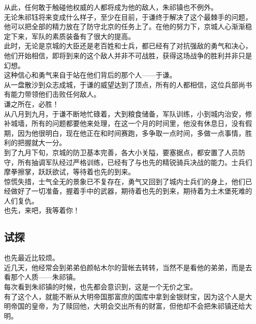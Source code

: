 \begin{multicols}{\theparacolNo}
从此，任何敢于触碰他权威的人都将成为他的敌人，朱祁镇也不例外。\\

无论朱祁钰将来变成什么样子，至少在目前，于谦终于解决了这个最棘手的问题，他可以把全部的精力放在了防守北京的任务上了。在他的努力下，京城人心渐渐稳定下来，军队的素质装备有了很大的提高。\\

此时，无论是京城的大臣还是老百姓和士兵，都已经有了对抗强敌的勇气和决心，他们开始相信，即将到来的这个敌人并非不可战胜，获得这场战争的胜利并非只是幻想。\\

这种信心和勇气来自于站在他们背后的那个人——于谦。\\

从一盘散沙到众志成城，于谦的威望达到了顶点，所有的人都相信，这位兵部尚书有能力带领他们击败任何敌人。\\

谦之所在，必胜！\\

从八月到九月，于谦不断地忙碌着，大到粮食储备，军队训练，小到城内治安，修补城墙，所有的问题都要他来处理，在这一个月的时间里，他没有休息日，没有假期，因为他很明白，现在他正在和时间赛跑，多争取一点时间，多做一点事情，胜利的把握就大一分。\\

到了九月下旬，京城的防卫基本完善，各大小关隘，要塞据点，都安置了人员防守，所有抽调军队经过严格训练，已经有了与也先的精锐骑兵决战的能力。士兵们摩拳擦掌，跃跃欲试，等待着也先的到来。\\

惊慌失措，士气全无的景象已不复存在，勇气又回到了城内士兵们的身上，他们已经做好了一切准备，握着手中的武器，期待着也先的到来，期待着为土木堡死难的人们复仇。\\

也先，来吧，我等着你！\\

\subsection{试探}
也先最近比较烦。\\

近几天，他经常会到弟弟伯颜帖木尔的营帐去转转，当然不是看他的弟弟，而是去看那个人质——朱祁镇。\\

每次看到朱祁镇的时候，也先都会意识到，这是一个无价之宝。\\

有了这个人，就能不断从大明帝国那富庶的国库中拿到金银财宝，因为这个人是大明帝国的皇帝，为了赎回他，大明会交出所有的财富，但他却不会把朱祁镇还给大明。\\


\end{multicols}
